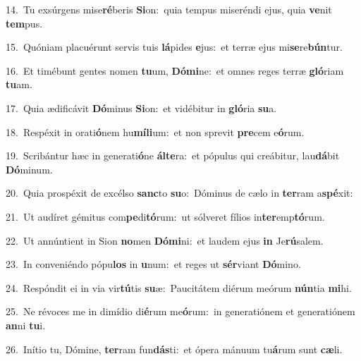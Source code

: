 {\numbfont\textcolor{\numbcolor}{14.}}~Tu exsúrgens mise\-\textbf{ré}\-beris \textbf{Si}\-on:~\star quia tempus miseréndi ejus, quia \textbf{ve}\-nit \textbf{tem}\-pus.\par
{\numbfont\textcolor{\numbcolor}{15.}}~Quóniam placuérunt servis tuis \textbf{lá}\-pides \textbf{e}\-jus:~\star et terræ ejus mi\-\textbf{se}\-re\-\textbf{bún}\-tur.\par
{\numbfont\textcolor{\numbcolor}{16.}}~Et timébunt gentes nomen \textbf{tu}\-um, \textbf{Dó}\-\textbf{mi}ne:~\star et omnes reges terræ \textbf{gló}\-riam \textbf{tu}\-am.\par
{\numbfont\textcolor{\numbcolor}{17.}}~Quia ædificávit \textbf{Dó}\-minus \textbf{Si}\-on:~\star et vidébitur in \textbf{gló}\-ria \textbf{su}\-a.\par
{\numbfont\textcolor{\numbcolor}{18.}}~Respéxit in orati\-\textbf{ó}\-nem hu\-\textbf{mí}\-\textbf{li}um:~\star et non sprevit \textbf{pre}\-cem e\-\textbf{ó}\-rum.\par
{\numbfont\textcolor{\numbcolor}{19.}}~Scribántur hæc in generati\-\textbf{ó}\-ne \textbf{ál}\-\textbf{te}ra:~\star et pópulus qui creábitur, lau\-\textbf{dá}\-bit \textbf{Dó}\-minum.\par
{\numbfont\textcolor{\numbcolor}{20.}}~Quia prospéxit de excélso \textbf{sanc}\-to \textbf{su}\-o:~\star Dóminus de cælo in \textbf{ter}\-ram a\-\textbf{spé}\-xit:\par
{\numbfont\textcolor{\numbcolor}{21.}}~Ut audíret gémitus com\-\textbf{pe}\-di\-\textbf{tó}\-rum:~\star ut sólveret fílios in\-\textbf{ter}\-emp\-\textbf{tó}\-rum.\par
{\numbfont\textcolor{\numbcolor}{22.}}~Ut annúntient in Sion \textbf{no}\-men \textbf{Dó}\-\textbf{mi}ni:~\star et laudem ejus \textbf{in} Je\-\textbf{rú}\-salem.\par
{\numbfont\textcolor{\numbcolor}{23.}}~In conveniéndo pópu\textbf{los} in \textbf{u}\-num:~\star et reges ut \textbf{sér}\-viant \textbf{Dó}\-mino.\par
{\numbfont\textcolor{\numbcolor}{24.}}~Respóndit ei in via vir\-\textbf{tú}\-tis \textbf{su}\-æ:~\star Paucitátem diérum meórum \textbf{nún}\-tia \textbf{mi}\-hi.\par
{\numbfont\textcolor{\numbcolor}{25.}}~Ne révoces me in dimídio di\-\textbf{é}\-rum me\-\textbf{ó}\-rum:~\star in generatiónem et generatiónem \textbf{an}\-ni \textbf{tu}\-i.\par
{\numbfont\textcolor{\numbcolor}{26.}}~Inítio tu, Dómine, \textbf{ter}\-ram fun\-\textbf{dás}\-ti:~\star et ópera mánuum tu\-\textbf{á}\-rum sunt \textbf{cæ}\-li.\par
